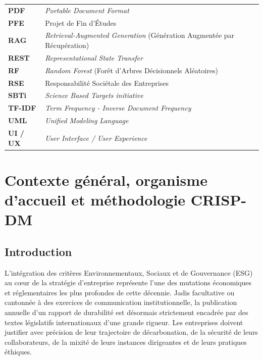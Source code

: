 \documentclass[12pt,a4paper]{report}
\begin{document}
\begin{longtable}{p{3.2cm}p{11.5cm}}
\textbf{PDF} & \textit{Portable Document Format} \\
\textbf{PFE} & Projet de Fin d'Études \\
\textbf{RAG} & \textit{Retrieval-Augmented Generation} (Génération Augmentée par Récupération) \\
\textbf{REST} & \textit{Representational State Transfer} \\
\textbf{RF} & \textit{Random Forest} (Forêt d'Arbres Décisionnels Aléatoires) \\
\textbf{RSE} & Responsabilité Sociétale des Entreprises \\
\textbf{SBTi} & \textit{Science Based Targets initiative} \\
\textbf{TF-IDF} & \textit{Term Frequency - Inverse Document Frequency} \\
\textbf{UML} & \textit{Unified Modeling Language} \\
\textbf{UI / UX} & \textit{User Interface / User Experience} \\
\bottomrule
\end{longtable}

\newpage
{}

\chapter{Contexte général, organisme d'accueil et méthodologie CRISP-DM}

\section{Introduction}
L'intégration des critères Environnementaux, Sociaux et de Gouvernance (ESG) au cœur de la stratégie d'entreprise représente l'une des mutations économiques et réglementaires les plus profondes de cette décennie. Jadis facultative ou cantonnée à des exercices de communication institutionnelle, la publication annuelle d'un rapport de durabilité est désormais strictement encadrée par des textes législatifs internationaux d'une grande rigueur. Les entreprises doivent justifier avec précision de leur trajectoire de décarbonation, de la sécurité de leurs collaborateurs, de la mixité de leurs instances dirigeantes et de leurs pratiques éthiques.\\
\end{document}
